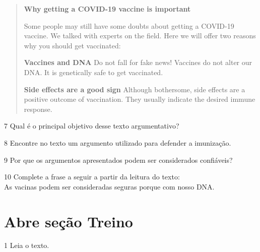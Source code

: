\begin{quote}
\textbf{Why getting a COVID-19 vaccine is important}

Some people may still have some doubts about getting a COVID-19 vaccine. We talked with experts on the field. Here we will offer two reasons why you should get vaccinated:

\textbf{Vaccines and DNA}
Do not fall for fake news! Vaccines do not alter our DNA. It is genetically safe to get vaccinated.

\textbf{Side effects are a good sign}
Although bothersome, side effects are a positive outcome of vaccination. They usually indicate the desired immune response.

\end{quote}

\num{7} Qual é o principal objetivo desse texto argumentativo?



\num{8} Encontre no texto um argumento utilizado para defender a
imunização.



\num{9} Por que os argumentos apresentados podem ser considerados
confiáveis?



\num{10} Complete a frase a seguir a partir da leitura do texto:\\
As vacinas podem ser consideradas seguras porque \preencher com nosso DNA.


\section{Abre seção Treino}

\num{1} Leia o texto.

